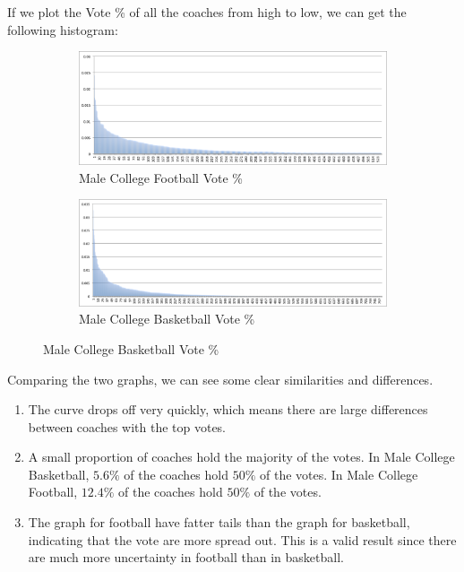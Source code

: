 \documentclass[titlepage,12pt]{article}
\begin{document}
\noindent If we plot the Vote \% of all the coaches from high to low, we can get the following histogram:

\begin{figure}[H]
      \centering
      \begin{subfigure}{1\textwidth}
      \caption{Male College Football Vote \%}
      \centering
      \includegraphics[width=1.1\textwidth]{graphs/football_score_dist.png}
      \end{subfigure}
      \begin{subfigure}{1\textwidth}
      \caption{Male College Basketball Vote \%}
      \centering
      \includegraphics[width=1.1\textwidth]{graphs/basketball_score_dist.png}
      \end{subfigure}
 \end{figure}

\noindent Comparing the two graphs, we can see some clear similarities and differences.

\begin{enumerate}
\item The curve drops off very quickly, which means there are large differences between coaches with the top votes.
\item A small proportion of coaches hold the majority of the votes. In Male College Basketball, $5.6\%$ of the coaches hold $50\%$ of the votes. In Male College Football, $12.4\%$ of the coaches hold $50\%$ of the votes.
\item The graph for football have fatter tails than the graph for basketball, indicating that the vote are more spread out. This is a valid result since there are much more uncertainty in football than in basketball.
\end{enumerate}
\end{document}

